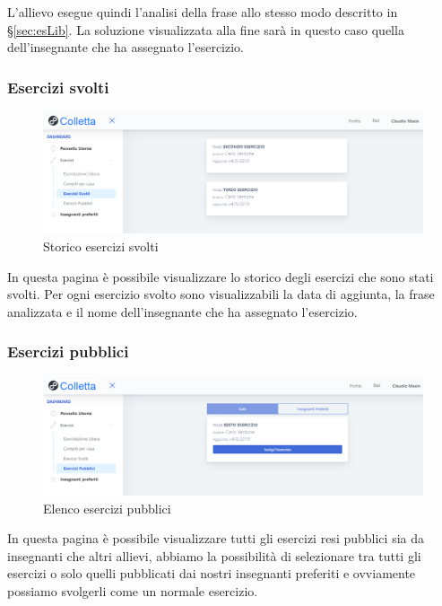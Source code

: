        	     
	L'allievo esegue quindi l'analisi della frase allo stesso modo descritto in \S\ref{sec:esLib}. La soluzione visualizzata alla fine sarà in questo caso quella dell'insegnante che ha assegnato l'esercizio.
        
        
        
        \subsubsection{Esercizi svolti}
        	\begin{figure}[H]
            	\centering
            	\includegraphics[width=17cm]{sez/img/studente/esercizisvolti.PNG} 
            	\caption{Storico esercizi svolti}\label{fig:1}
        	\end{figure}
          In questa pagina è possibile visualizzare lo storico degli esercizi che sono stati svolti. Per ogni esercizio svolto sono visualizzabili la data di aggiunta, la frase analizzata e il nome dell'insegnante che ha assegnato l'esercizio.
          
          
           \subsubsection{Esercizi pubblici}
        	\begin{figure}[H]
            	\centering
            	\includegraphics[width=17cm]{sez/img/studente/esercizipubblici.PNG} 
            	\caption{Elenco esercizi pubblici}\label{fig:1}
        	\end{figure}
        	In questa pagina è possibile visualizzare tutti gli esercizi resi pubblici sia da insegnanti che altri allievi, abbiamo la possibilità  di selezionare tra tutti gli esercizi o solo quelli pubblicati dai nostri insegnanti preferiti e ovviamente possiamo svolgerli come un normale esercizio. 
        
